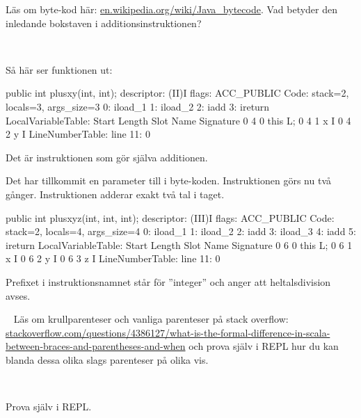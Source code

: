 \Subtask Läs om byte-kod här: \href{https://en.wikipedia.org/wiki/Java\_bytecode}{en.wikipedia.org/wiki/Java\_bytecode}. Vad betyder den inledande bokstaven i additionsinstruktionen?


\SOLUTION

\TaskSolved \what~

\SubtaskSolved Så här ser funktionen  ut:
\begin{REPL}
public int plusxy(int, int);
  descriptor: (II)I
  flags: ACC_PUBLIC
  Code:
    stack=2, locals=3, args_size=3
       0: iload_1
       1: iload_2
       2: iadd
       3: ireturn
    LocalVariableTable:
      Start  Length  Slot  Name   Signature
          0       4     0  this   L;
          0       4     1     x   I
          0       4     2     y   I
    LineNumberTable:
      line 11: 0
\end{REPL}
Det är instruktionen  som gör själva additionen.


\SubtaskSolved Det har tillkommit en parameter till i byte-koden. Instruktionen  görs nu två gånger. Instruktionen  adderar exakt två tal i taget.

\begin{REPL}
public int plusxyz(int, int, int);
  descriptor: (III)I
  flags: ACC_PUBLIC
  Code:
    stack=2, locals=4, args_size=4
       0: iload_1
       1: iload_2
       2: iadd
       3: iload_3
       4: iadd
       5: ireturn
    LocalVariableTable:
      Start  Length  Slot  Name   Signature
          0       6     0  this   L;
          0       6     1     x   I
          0       6     2     y   I
          0       6     3     z   I
    LineNumberTable:
      line 11: 0
\end{REPL}


\SubtaskSolved Prefixet  i instruktionsnamnet  står för ''integer'' och anger att heltalsdivision avses.

\QUESTEND





\QUESTBEGIN

\Task  \what~ Läs om krullparenteser och vanliga parenteser på stack overflow: \\ \href{http://stackoverflow.com/questions/4386127/what-is-the-formal-difference-in-scala-between-braces-and-parentheses-and-when}{stackoverflow.com/questions/4386127/what-is-the-formal-difference-in-scala-between-braces-and-parentheses-and-when} och prova själv i REPL hur du kan blanda dessa olika slags parenteser på olika vis.

\SOLUTION

\TaskSolved \what~

\SubtaskSolved Prova själv i REPL.

\QUESTEND
